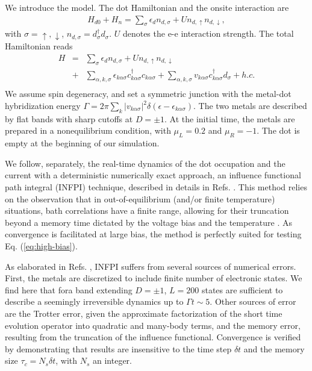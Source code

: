 \documentclass[aps,pra,twocolumn,groupedaddress,showpacs,superscriptaddress,amssymb,amsmath]{revtex4-1}
\newcommand{\bea}{\begin{eqnarray}}
\newcommand{\eea}{\end{eqnarray}}
\begin{document}
We introduce the model. The dot Hamiltonian and the onsite interaction are 
%
\bea
H_{d0}+H_n= \sum_{\sigma} \epsilon_d n_{d,\sigma} + Un_{d,\uparrow}n_{d, \downarrow},
\eea
%
with $\sigma=\uparrow,\downarrow$, $n_{d,\sigma}=d^{\dagger}_{\sigma}d_{\sigma}$. $U$ denotes the e-e interaction strength.
The total Hamiltonian reads
%
\bea
H &=&  %
\sum_{\sigma} \epsilon_d n_{d,\sigma} + Un_{d,\uparrow}n_{d, \downarrow}
\nonumber\\
&+& \sum_{\alpha,k,\sigma}\epsilon_{k\alpha\sigma} c_{k\alpha\sigma}^{\dagger} c_{k\alpha\sigma}
+\sum_{\alpha,k,\sigma} v_{k\alpha\sigma} c_{k\alpha\sigma}^{\dagger}d_{\sigma} + h.c. 
\nonumber\\
\eea
% 
We assume spin degeneracy, and set a symmetric junction 
with the metal-dot hybridization energy
$\Gamma= 2\pi \sum_{k}|v_{k\alpha\sigma}|^2\delta(\epsilon-\epsilon_{k\alpha\sigma})$.
The two metals are described by flat bands with sharp cutoffs at $D=\pm 1$.
At the initial time, the metals are prepared in a nonequilibrium condition, with $\mu_L=0.2$ and $\mu_R=-1$.
The dot is empty at the beginning of our simulation.

We follow, separately, the real-time dynamics of
the dot occupation and the current with
a deterministic numerically exact approach, 
an influence functional path integral (INFPI) technique, described in details in Refs.  \cite{IF1,IF2}.
This method relies on the observation that in out-of-equilibrium (and/or finite
temperature) situations, bath correlations have a finite range,
allowing for their truncation beyond a memory time dictated
by the voltage bias and the temperature \cite{Makri1}. 
As convergence is facilitated at large bias, the method is perfectly suited for testing Eq. (\ref{eq:high-bias}).


As elaborated in Refs.  \cite{IF1,IF2}, INFPI suffers from several sources of numerical errors. 
First, the metals are discretized to 
include finite number of electronic states. 
We find here that fora band extending $D=\pm 1$, $L=200$ states
are sufficient to describe a seemingly irreversible dynamics up to $\Gamma t\sim 5$.
Other sources of error are the Trotter error,
given the approximate factorization of the 
short time evolution operator into quadratic and
many-body terms, and the memory error, resulting from the
truncation of the influence functional. Convergence is verified by demonstrating
that results are insensitive to the time step $\delta t$ and the memory
size $\tau_c=N_s\delta t$, with $N_s$ an integer.
\end{document}
